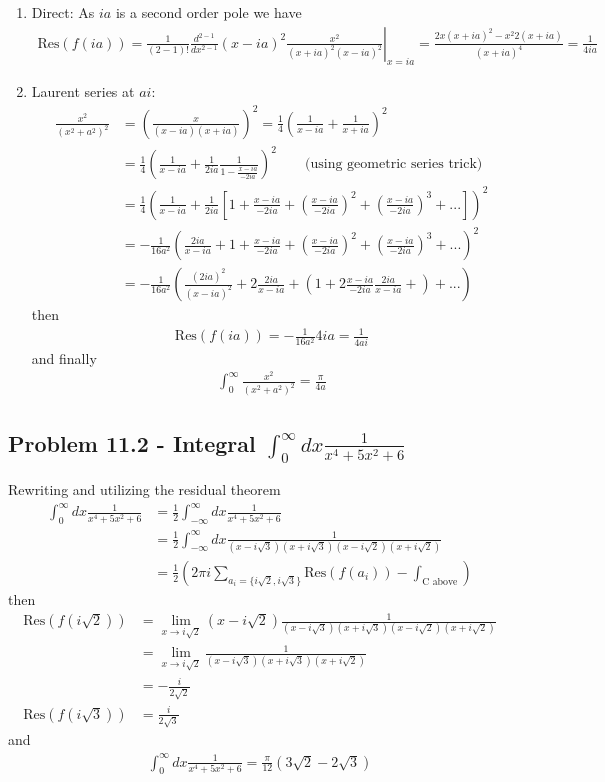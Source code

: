\documentclass[10pt,a4paper]{book}
\theoremstyle{definition}
\begin{document}
\begin{enumerate}
\item Direct: As $ia$ is a second order pole we have
\begin{align}
\text{Res}(f(ia))
=\frac{1}{(2-1)!}\left.\frac{d^{2-1}}{dx^{2-1}}(x-ia)^2\frac{x^2}{(x+ia)^2(x-ia)^2}\right|_{x=ia}
=\frac{2x(x+ia)^2-x^2 2(x+ia)}{(x+ia)^4}=\frac{1}{4ia}
\end{align}
\item Laurent series at $ai$:
\begin{align}
\frac{x^2}{(x^2+a^2)^2}
&=\left(\frac{x}{(x-ia)(x+ia)}\right)^2
=\frac{1}{4}\left(\frac{1}{x-ia}+\frac{1}{x+ia}\right)^2\\
&=\frac{1}{4}\left(\frac{1}{x-ia}+\frac{1}{2ia}\frac{1}{1-\frac{x-ia}{-2ia}}\right)^2\qquad\text{(using geometric series trick)}\\
&=\frac{1}{4}\left(\frac{1}{x-ia}+\frac{1}{2ia}\left[1+\frac{x-ia}{-2ia}+\left(\frac{x-ia}{-2ia}\right)^2+\left(\frac{x-ia}{-2ia}\right)^3+...\right]\right)^2\\
&=-\frac{1}{16a^2}\left(\frac{2ia}{x-ia}+1+\frac{x-ia}{-2ia}+\left(\frac{x-ia}{-2ia}\right)^2+\left(\frac{x-ia}{-2ia}\right)^3+...\right)^2\\
&=-\frac{1}{16a^2}\left(\frac{(2ia)^2}{(x-ia)^2}+2\frac{2ia}{x-ia}+\left(1+2\frac{x-ia}{-2ia}\frac{2ia}{x-ia}+\right)+...\right)
\end{align}
then 
\begin{align}
\text{Res}(f(ia))=-\frac{1}{16a^2}4ia=\frac{1}{4ai}
\end{align}
and finally
\begin{align}
\int_0^\infty\frac{x^2}{(x^2+a^2)^2}=\frac{\pi}{4a}
\end{align}
\end{enumerate}

\subsection{Problem 11.2 - Integral $\int_0^\infty dx \frac{1}{x^4+5x^2+6}$}
Rewriting and utilizing the residual theorem
\begin{align}
\int_0^\infty dx\frac{1}{x^4+5x^2+6}
&=\frac{1}{2}\int_{-\infty}^\infty dx\frac{1}{x^4+5x^2+6}\\
&=\frac{1}{2}\int_{-\infty}^\infty dx\frac{1}{(x-i\sqrt{3})(x+i\sqrt{3})(x-i\sqrt{2})(x+i\sqrt{2})}\\
&=\frac{1}{2}\left(2\pi i\sum_{a_i=\{i\sqrt{2},i\sqrt{3}\}}\text{Res}(f(a_i))-\int_\text{C above}\right)
\end{align}
then
\begin{align}
\text{Res}(f(i\sqrt{2}))
&=\lim_{x\rightarrow i\sqrt{2}}(x-i\sqrt{2})\frac{1}{(x-i\sqrt{3})(x+i\sqrt{3})(x-i\sqrt{2})(x+i\sqrt{2})}\\
&=\lim_{x\rightarrow i\sqrt{2}}\frac{1}{(x-i\sqrt{3})(x+i\sqrt{3})(x+i\sqrt{2})}\\
&=-\frac{i}{2\sqrt{2}}\\
\text{Res}(f(i\sqrt{3}))
&=\frac{i}{2\sqrt{3}}
\end{align}
and
\begin{align}
\int_0^\infty dx\frac{1}{x^4+5x^2+6}=\frac{\pi}{12}(3\sqrt{2}-2\sqrt{3})
\end{align}
\end{document}
